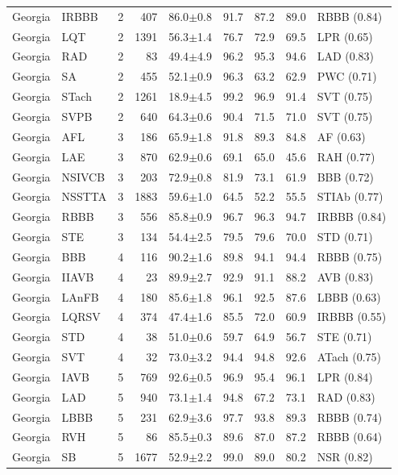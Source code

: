 \begin{longtable}{@{}llcrrrrrl@{}}
Georgia & IRBBB & 2 & 407 & 86.0$\pm$0.8 & 91.7 & 87.2 & 89.0 & RBBB (0.84) \\
Georgia & LQT & 2 & 1391 & 56.3$\pm$1.4 & 76.7 & 72.9 & 69.5 & LPR (0.65) \\
Georgia & RAD & 2 & 83 & 49.4$\pm$4.9 & 96.2 & 95.3 & 94.6 & LAD (0.83) \\
Georgia & SA & 2 & 455 & 52.1$\pm$0.9 & 96.3 & 63.2 & 62.9 & PWC (0.71) \\
Georgia & STach & 2 & 1261 & 18.9$\pm$4.5 & 99.2 & 96.9 & 91.4 & SVT (0.75) \\
Georgia & SVPB & 2 & 640 & 64.3$\pm$0.6 & 90.4 & 71.5 & 71.0 & SVT (0.75) \\
Georgia & AFL & 3 & 186 & 65.9$\pm$1.8 & 91.8 & 89.3 & 84.8 & AF (0.63) \\
Georgia & LAE & 3 & 870 & 62.9$\pm$0.6 & 69.1 & 65.0 & 45.6 & RAH (0.77) \\
Georgia & NSIVCB & 3 & 203 & 72.9$\pm$0.8 & 81.9 & 73.1 & 61.9 & BBB (0.72) \\
Georgia & NSSTTA & 3 & 1883 & 59.6$\pm$1.0 & 64.5 & 52.2 & 55.5 & STIAb (0.77) \\
Georgia & RBBB & 3 & 556 & 85.8$\pm$0.9 & 96.7 & 96.3 & 94.7 & IRBBB (0.84) \\
Georgia & STE & 3 & 134 & 54.4$\pm$2.5 & 79.5 & 79.6 & 70.0 & STD (0.71) \\
Georgia & BBB & 4 & 116 & 90.2$\pm$1.6 & 89.8 & 94.1 & 94.4 & RBBB (0.75) \\
Georgia & IIAVB & 4 & 23 & 89.9$\pm$2.7 & 92.9 & 91.1 & 88.2 & AVB (0.83) \\
Georgia & LAnFB & 4 & 180 & 85.6$\pm$1.8 & 96.1 & 92.5 & 87.6 & LBBB (0.63) \\
Georgia & LQRSV & 4 & 374 & 47.4$\pm$1.6 & 85.5 & 72.0 & 60.9 & IRBBB (0.55) \\
Georgia & STD & 4 & 38 & 51.0$\pm$0.6 & 59.7 & 64.9 & 56.7 & STE (0.71) \\
Georgia & SVT & 4 & 32 & 73.0$\pm$3.2 & 94.4 & 94.8 & 92.6 & ATach (0.75) \\
Georgia & IAVB & 5 & 769 & 92.6$\pm$0.5 & 96.9 & 95.4 & 96.1 & LPR (0.84) \\
Georgia & LAD & 5 & 940 & 73.1$\pm$1.4 & 94.8 & 67.2 & 73.1 & RAD (0.83) \\
Georgia & LBBB & 5 & 231 & 62.9$\pm$3.6 & 97.7 & 93.8 & 89.3 & RBBB (0.74) \\
Georgia & RVH & 5 & 86 & 85.5$\pm$0.3 & 89.6 & 87.0 & 87.2 & RBBB (0.64) \\
Georgia & SB & 5 & 1677 & 52.9$\pm$2.2 & 99.0 & 89.0 & 80.2 & NSR (0.82) \\

\end{longtable}
